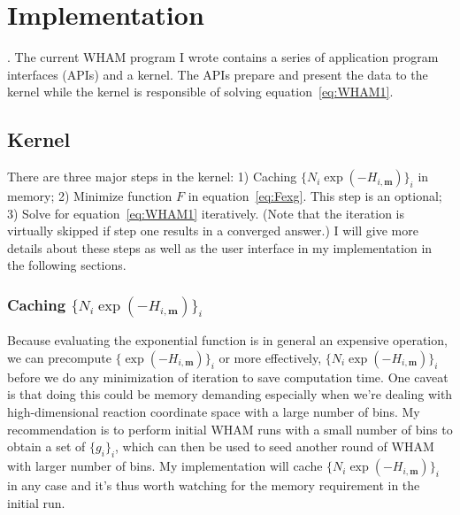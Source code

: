 \section{Implementation}\label{sec:impl}
. The current WHAM
program I wrote contains a series of application program interfaces (APIs) and
a kernel. The APIs prepare and present the data to the kernel while the kernel
is responsible of solving equation~\ref{eq:WHAM1}.

\subsection{Kernel}
There are three major steps in the kernel: 
1) Caching $\{N_{i}\exp(-H_{i,\mathbf{m}})\}_{i}$ in memory;
2) Minimize function $F$ in equation~\ref{eq:Fexg}. This step is an optional;
3) Solve for equation~\ref{eq:WHAM1} iteratively. (Note that the iteration is
virtually skipped if step one results in a converged answer.) 
I will give more details about these steps as well as the user interface
in my implementation in the following sections. 

\subsubsection{Caching $\{N_{i}\exp(-H_{i,\mathbf{m}})\}_{i}$}
Because evaluating the exponential function is in general an expensive 
operation, we can precompute $\{\exp(-H_{i,\mathbf{m}})\}_{i}$ or more effectively, 
$\{N_{i}\exp(-H_{i,\mathbf{m}})\}_{i}$ before we do any minimization of iteration
to save computation time. One caveat is that doing this could be 
memory demanding especially when we're dealing with high-dimensional 
reaction coordinate space with a large number of bins. My recommendation 
is to perform initial WHAM runs with a small number of bins to obtain 
a set of $\{g_{i}\}_{i}$, which can then be used to seed another round
of WHAM with larger number of bins. My implementation will cache
$\{N_{i}\exp(-H_{i,\mathbf{m}})\}_{i}$ in any case and it's thus worth watching 
for the memory requirement in the initial run.

